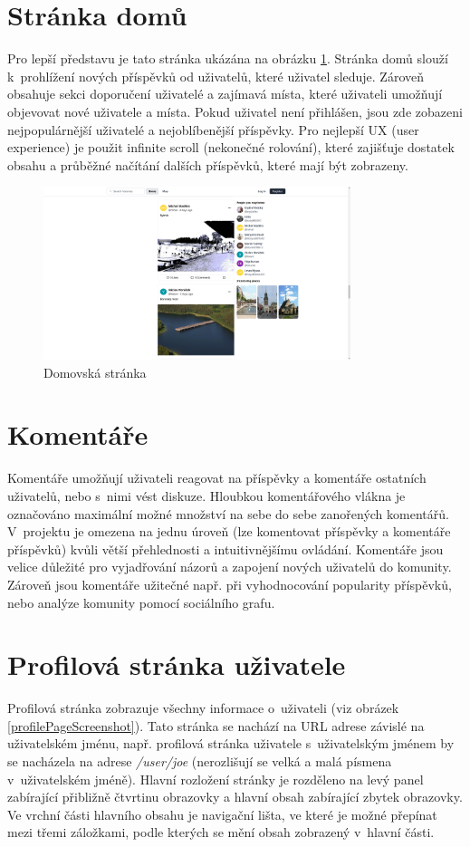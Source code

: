 \documentclass[12pt, a4paper,
  oneside,      %
]{report}
\begin{document}
\section{Stránka domů}
Pro lepší představu je tato stránka ukázána na obrázku \ref{figure:homePagePreview}. Stránka domů slouží k~prohlížení nových příspěvků od uživatelů, které uživatel sleduje. Zároveň obsahuje sekci doporučení uživatelé a zajímavá místa, které uživateli umožňují objevovat nové uživatele a místa. Pokud uživatel není přihlášen, jsou zde zobazeni nejpopulárnější uživatelé a nejoblíbenější příspěvky. Pro nejlepší UX (user experience) je použit infinite scroll (nekonečné rolování), které zajišťuje dostatek obsahu a průběžné načítání dalších příspěvků, které mají být zobrazeny.

\begin{figure}[h]
	\centering
	\includegraphics[width=0.8\textwidth]{images/home_page.png}
	\caption{Domovská stránka}\label{figure:homePagePreview}
\end{figure}

\section{Komentáře}
Komentáře umožňují uživateli reagovat na příspěvky a komentáře ostatních uživatelů, nebo s~nimi vést diskuze. Hloubkou komentářového vlákna je označováno maximální možné množství na sebe do sebe zanořených komentářů. V~projektu je omezena na jednu úroveň (lze komentovat příspěvky a komentáře příspěvků) kvůli větší přehlednosti a intuitivnějšímu ovládání. Komentáře jsou velice důležité pro vyjadřování názorů a zapojení nových uživatelů do komunity. Zároveň jsou komentáře užitečné např. při vyhodnocování popularity příspěvků, nebo analýze komunity pomocí sociálního grafu.
\cite{whyAreCommentsImportant}

\section{Profilová stránka uživatele}
Profilová stránka zobrazuje všechny informace o~uživateli (viz obrázek \ref{profilePageScreenshot}). Tato stránka se nachází na URL adrese závislé na uživatelském jménu, např. profilová stránka uživatele s~uživatelským jménem  by se nacházela na adrese \textit{/user/joe} (nerozlišují se velká a malá písmena v~uživatelském jméně). Hlavní rozložení stránky je rozděleno na levý panel zabírající přibližně čtvrtinu obrazovky a hlavní obsah zabírající zbytek obrazovky. Ve vrchní části hlavního obsahu je navigační lišta, ve které je možné přepínat mezi třemi záložkami, podle kterých se mění obsah zobrazený v~hlavní části.
\clearpage
\end{document}
